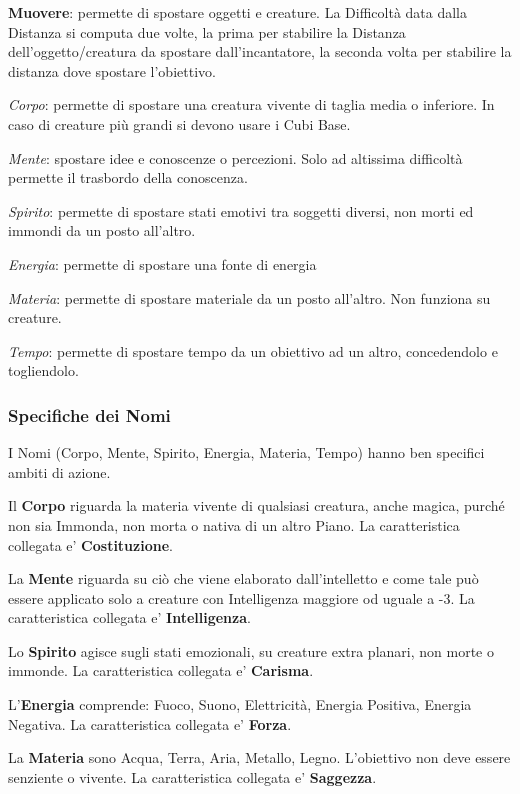 \documentclass[a4paper,twoside,openany]{book}
\begin{document}
\begin{multicols}{2}
\textbf{Muovere}: permette di spostare oggetti e creature. La Difficoltà data dalla Distanza si computa due volte, la prima per stabilire la Distanza dell'oggetto/creatura da spostare dall'incantatore, la seconda volta per stabilire la distanza dove spostare l'obiettivo.

\textit{Corpo}: permette di spostare una creatura vivente di taglia media o inferiore. In caso di creature più grandi si devono usare i Cubi Base.

\textit{Mente}: spostare idee e conoscenze o percezioni. Solo ad altissima difficoltà permette il trasbordo della conoscenza.

\textit{Spirito}: permette di spostare stati emotivi tra soggetti diversi, non morti ed immondi da un posto all'altro.

\textit{Energia}: permette di spostare una fonte di energia

\textit{Materia}: permette di spostare materiale da un posto all'altro. Non funziona su creature.

\textit{Tempo}: permette di spostare tempo da un obiettivo ad un altro, concedendolo e togliendolo.


\subsubsection{Specifiche dei Nomi}

\label{Specifiche dei Nomi}

I Nomi (Corpo, Mente, Spirito, Energia, Materia, Tempo) hanno ben specifici ambiti di azione.

Il \textbf{Corpo} riguarda la materia vivente di qualsiasi creatura, anche magica, purché non sia Immonda, non morta o nativa di un altro Piano. La caratteristica collegata e' \textbf{Costituzione}.

La \textbf{Mente} riguarda su ciò che viene elaborato dall'intelletto e come tale può essere applicato solo a creature con Intelligenza maggiore od uguale a -3. La caratteristica collegata e' \textbf{Intelligenza}.

Lo \textbf{Spirito} agisce sugli stati emozionali, su creature extra planari, non morte o immonde. La caratteristica collegata e' \textbf{Carisma}.

L'\textbf{Energia} comprende: Fuoco, Suono, Elettricità, Energia Positiva, Energia Negativa. La caratteristica collegata e' \textbf{Forza}.

La \textbf{Materia} sono Acqua, Terra, Aria, Metallo, Legno. L'obiettivo non deve essere senziente o vivente. La caratteristica collegata e' \textbf{Saggezza}.


\end{multicols}
\end{document}
